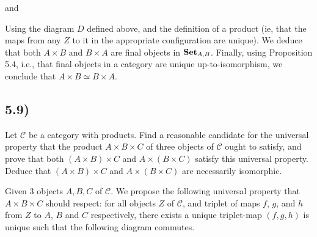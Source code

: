 and


Using the diagram $D$ defined above, and the definition of a product (ie, that the maps from any $Z$ to it in the appropriate configuration are unique). We deduce that both $A \times B$ and $B \times A$ are final objects in $\text{\textbf{Set}}_{A,B}$. Finally, using Proposition 5.4, i.e., that final objects in a category are unique up-to-isomorphism, we conclude that $A \times B \simeq B \times A$.



\subsection*{5.9)}

Let $\mathcal{C}$ be a category with products. Find a reasonable candidate for the universal property that the product $A \times B \times C$ of three objects of $\mathcal{C}$ ought to satisfy, and prove that both $(A \times B) \times C$ and $A \times (B \times C)$ satisfy this universal property. Deduce that $(A \times B) \times C$ and $A \times (B \times C)$ are necessarily isomorphic.

Given 3 objects $A, B, C$ of $\mathcal{C}$. We propose the following universal property that $A \times B \times C$ should respect: for all objects $Z$ of $\mathcal{C}$, and triplet of maps $f$, $g$, and $h$ from $Z$ to $A$, $B$ and $C$ respectively, there exists a unique triplet-map $(f,g,h)$ is unique such that the following diagram commutes.

